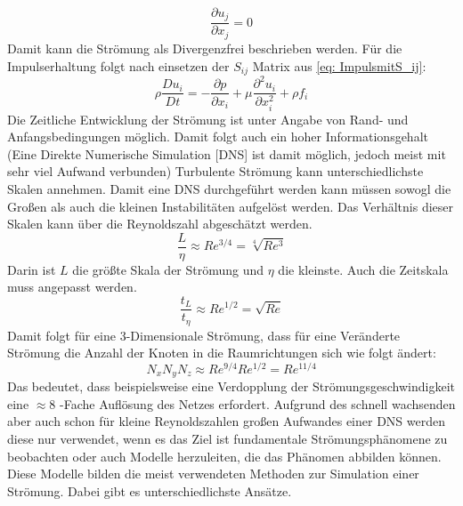 \begin{equation}
	\frac{\partial u_{j}}{\partial x_{j}}=0
\end{equation}
Damit kann die Strömung als Divergenzfrei beschrieben werden. Für die Impulserhaltung folgt nach einsetzen der $S_{ij}$ Matrix aus \ref{eq: ImpulsmitS_ij}: 
\begin{equation}
	\rho \frac{Du_i}{Dt} = -\frac{\partial p}{\partial x_i}+\mu \frac{\partial^2 u_i}{\partial x^{2}_{i}} + \rho f_i
\end{equation}
Die Zeitliche Entwicklung der Strömung ist unter Angabe von Rand- und Anfangsbedingungen möglich. Damit folgt auch ein hoher Informationsgehalt (Eine Direkte Numerische Simulation [DNS] ist damit möglich, jedoch meist mit sehr viel Aufwand verbunden) 
Turbulente Strömung kann unterschiedlichste Skalen annehmen. Damit eine DNS durchgeführt werden kann müssen sowogl die Großen als auch die kleinen Instabilitäten aufgelöst werden. Das Verhältnis dieser Skalen kann über die Reynoldszahl abgeschätzt werden. 
\begin{equation}
	\frac{L}{\eta} \approx Re^{3/4} = \sqrt[4]{Re^3}
\end{equation}
Darin ist $L$ die größte Skala der Strömung und $\eta$ die kleinste. Auch die Zeitskala muss angepasst werden.
\begin{equation}
	\frac{t_L}{t_{\eta}} \approx Re^{1/2} = \sqrt{Re}
\end{equation}
Damit folgt für eine 3-Dimensionale Strömung, dass für eine Veränderte Strömung die Anzahl der Knoten in die Raumrichtungen sich wie folgt ändert:
\begin{equation}
	N_xN_yN_z \approx Re^{9/4}Re^{1/2} = Re^{11/4}
\end{equation}
Das bedeutet, dass beispielsweise eine Verdopplung der Strömungsgeschwindigkeit eine $\approx$8 -Fache Auflösung des Netzes erfordert. Aufgrund des schnell wachsenden aber auch schon für kleine Reynoldszahlen großen Aufwandes einer DNS werden diese nur verwendet, wenn es das Ziel ist fundamentale Strömungsphänomene zu beobachten oder auch Modelle herzuleiten, die das Phänomen abbilden können. Diese Modelle bilden die meist verwendeten Methoden zur Simulation einer Strömung. Dabei gibt es unterschiedlichste Ansätze. 


